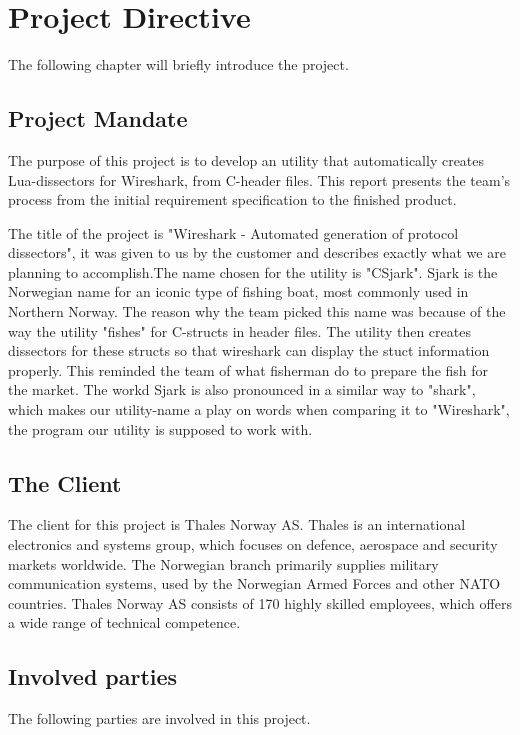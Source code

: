 \chapter{Project Directive}

The following chapter will briefly introduce the project.     

\section{Project Mandate}
The purpose of this project is to develop an utility that automatically creates Lua-dissectors for Wireshark, from C-header files. This report presents the team’s process from the initial requirement specification to the finished product. 

The title of the project is "Wireshark - Automated generation of protocol dissectors", it was given to us by the customer and describes exactly what we are planning
to accomplish.The name chosen for the utility is "CSjark". Sjark is the Norwegian name for an iconic type of fishing boat, most commonly used in Northern Norway. The reason why the team picked this name was because of the way the utility "fishes" for C-structs in header files. The utility then creates dissectors for these structs so that wireshark can display the stuct information properly. This reminded the team of what fisherman do to prepare the fish for the market. The workd Sjark is also pronounced in a similar way to "shark", which makes our utility-name a play on words when comparing it to "Wireshark", the program our utility is supposed to work with.

\section{The Client}
The client for this project is Thales Norway AS. Thales is an international electronics and systems group, which focuses on defence, aerospace and security markets worldwide. The Norwegian branch primarily supplies military communication systems, used by the Norwegian Armed Forces and other NATO countries. Thales Norway AS consists of 170 highly skilled employees, which offers a wide range of technical competence.

\section{Involved parties}
The following parties are involved in this project.

